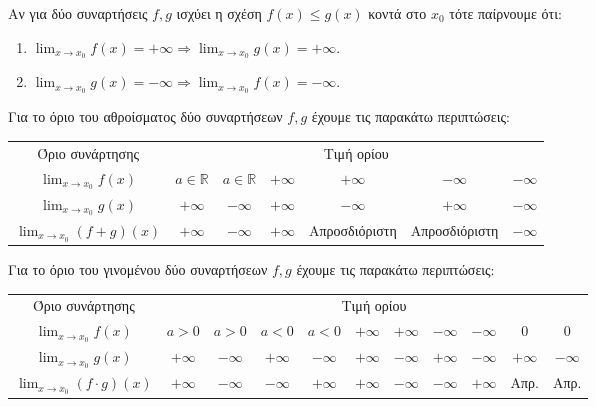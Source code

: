 \documentclass[twoside,nofonts,ektypwsh,math,spyros]{frontisthrio}
\begin{document}
Αν για δύο συναρτήσεις $ f,g $ ισχύει η σχέση $ f(x)\leq g(x) $ κοντά στο $ x_0 $ τότε παίρνουμε ότι:
\begin{enumerate}[itemsep=0mm,label=\roman*.]
\item $ \displaystyle{\lim_{x\rightarrow x_0}f(x)}=+\infty\Rightarrow \displaystyle{\lim_{x\rightarrow x_0}g(x)}=+\infty $.
\item $ \displaystyle{\lim_{x\rightarrow x_0}g(x)}=-\infty\Rightarrow \displaystyle{\lim_{x\rightarrow x_0}f(x)}=-\infty $.
\end{enumerate}
Για το όριο του αθροίσματος δύο συναρτήσεων $ f,g $ έχουμε τις παρακάτω περιπτώσεις:
\begin{center}
\begin{tabular}{c|cccccc}
\hline  Όριο συνάρτησης & \multicolumn{6}{c}{Τιμή ορίου} \rule[-2ex]{0pt}{5.5ex}\\
\hhline{=======} \rule[-2ex]{0pt}{5.5ex} $ \displaystyle{\lim_{x\rightarrow x_0}f(x)} $ & $ a\in\mathbb{R} $ & $ a\in\mathbb{R} $ & $ +\infty $ & $ +\infty $ & $ -\infty $ & $ -\infty $ \\ 
\rule[-2ex]{0pt}{5.5ex} $ \displaystyle{\lim_{x\rightarrow x_0}g(x)} $ & $ +\infty $ & $ -\infty $ & $ +\infty $ & $ -\infty $ & $ +\infty $ & $ -\infty $ \\ 
\hhline{~------}\rule[-2ex]{0pt}{5.5ex} $ \displaystyle{\lim_{x\rightarrow x_0}(f+g)(x)} $ & $ +\infty $ & $ -\infty $ & $ +\infty $ & Απροσδιόριστη & Απροσδιόριστη & $ -\infty $ \\ 
\hline 
\end{tabular}
\end{center}
Για το όριο του γινομένου δύο συναρτήσεων $ f,g $ έχουμε τις παρακάτω περιπτώσεις:
\begin{center}
\begin{tabular}{c|cccccccccc}
\hline  Όριο συνάρτησης & \multicolumn{10}{c}{Τιμή ορίου} \rule[-2ex]{0pt}{5.5ex}\\
\hhline{===========} \rule[-2ex]{0pt}{5.5ex} $ \displaystyle{\lim_{x\rightarrow x_0}f(x)} $ & $ a>0 $ & $ a>0 $ & $ a<0 $ & $ a<0 $ & $ +\infty $ & $ +\infty $ & $ -\infty $ & $ -\infty $ & 0 & 0 \\ 
\rule[-2ex]{0pt}{5.5ex} $ \displaystyle{\lim_{x\rightarrow x_0}g(x)} $ & $ +\infty $ & $ -\infty $ & $ +\infty $ & $ -\infty $ & $ +\infty $ & $ -\infty $ & $ +\infty $ & $ -\infty $ & $ +\infty $ & $ -\infty $ \\ 
\hhline{~----------}\rule[-2ex]{0pt}{5.5ex} $ \displaystyle{\lim_{x\rightarrow x_0}(f\cdot g)(x)} $ & $ +\infty $ & $ -\infty $ & $ -\infty $ & $ +\infty $ & $ +\infty $ & $ -\infty $ & $ -\infty $ & $ +\infty $ & Απρ. & Απρ. \\ 
\hline 
\end{tabular}
\end{center}
\end{document}
